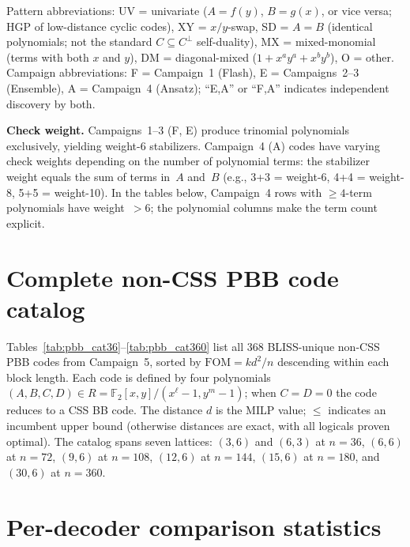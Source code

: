 \documentclass[aps,prxquantum,twocolumn,superscriptaddress,nofootinbib]{revtex4-2}
\newcommand{\FF}{\ensuremath{\mathbb{F}}}
\newcommand{\FOM}{\ensuremath{\mathrm{FOM}}}
\begin{document}
Pattern abbreviations: UV = univariate ($A = f(y)$, $B = g(x)$, or vice versa; HGP of low-distance cyclic codes), XY = $x/y$-swap, SD = $A = B$ (identical polynomials; not the standard $C \subseteq C^\perp$ self-duality), MX = mixed-monomial (terms with both $x$ and $y$), DM = diagonal-mixed ($1 + x^a y^a + x^b y^b$), O = other.
Campaign abbreviations: F = Campaign~1 (Flash), E = Campaigns~2--3 (Ensemble), A = Campaign~4 (Ansatz); ``E,A'' or ``F,A'' indicates independent discovery by both.

\textbf{Check weight.}
Campaigns~1--3 (F, E) produce trinomial polynomials exclusively, yielding weight-6 stabilizers.
Campaign~4 (A) codes have varying check weights depending on the number of polynomial terms: the stabilizer weight equals the sum of terms in~$A$ and~$B$ (e.g., 3+3 = weight-6, 4+4 = weight-8, 5+5 = weight-10).
In the tables below, Campaign~4 rows with $\geq 4$-term polynomials have weight~$> 6$; the polynomial columns make the term count explicit.



\section{Complete non-CSS PBB code catalog}
\label{sm:pbb_catalog}

Tables~\ref{tab:pbb_cat36}--\ref{tab:pbb_cat360} list all 368 BLISS-unique non-CSS PBB codes from Campaign~5, sorted by $\FOM = kd^2/n$ descending within each block length.
Each code is defined by four polynomials $(A, B, C, D) \in R = \FF_2[x,y]/(x^\ell{-}1, y^m{-}1)$; when $C = D = 0$ the code reduces to a CSS BB code.
The distance $d$ is the MILP value; $\leq$ indicates an incumbent upper bound (otherwise distances are exact, with all logicals proven optimal).
The catalog spans seven lattices: $(3,6)$ and $(6,3)$ at $n = 36$, $(6,6)$ at $n = 72$, $(9,6)$ at $n = 108$, $(12,6)$ at $n = 144$, $(15,6)$ at $n = 180$, and $(30,6)$ at $n = 360$.



\section{Per-decoder comparison statistics}
\label{sm:decoders}
\end{document}
